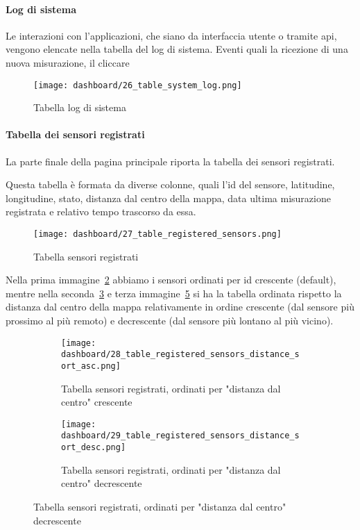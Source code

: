 \paragraph{Log di sistema}

Le interazioni con l'applicazioni, che siano da interfaccia utente o tramite \acrshort{api}, vengono elencate
nella tabella del log di sistema. Eventi quali la ricezione di una nuova misurazione, il cliccare

\begin{figure}[H]
  \centering
  \texttt{[image: dashboard/26\_table\_system\_log.png]}
  \caption{Tabella log di sistema}
  \label{fig:app-tab-system-log}
\end{figure}

\paragraph{Tabella dei sensori registrati}

La parte finale della pagina principale riporta la tabella dei sensori registrati.

Questa tabella è formata da diverse colonne, quali l'id del sensore, latitudine, longitudine, stato,
distanza dal centro della mappa, data ultima misurazione registrata e relativo tempo trascorso da essa.

\begin{figure}[H]
  \centering
  \texttt{[image: dashboard/27\_table\_registered\_sensors.png]}
  \caption{Tabella sensori registrati}
  \label{fig:app-tab-registered-sensors}
\end{figure}

Nella prima immagine~\ref{fig:app-tab-registered-sensors} abbiamo i sensori ordinati per id crescente (default),
mentre nella seconda~\ref{fig:app-tab-registered-sensors-distance-sort-asc} e
terza immagine~\ref{fig:app-tab-registered-sensors-distance-sort-desc} si ha la tabella ordinata rispetto
la distanza dal centro della mappa relativamente in ordine crescente (dal sensore più prossimo al più remoto) e
decrescente (dal sensore più lontano al più vicino).

\begin{figure}[H]
  \centering
  \begin{subfigure}{\textwidth}
    \centering
    \texttt{[image: dashboard/28\_table\_registered\_sensors\_distance\_sort\_asc.png]}
    \caption{Tabella sensori registrati, ordinati per "distanza dal centro" crescente}
    \label{fig:app-tab-registered-sensors-distance-sort-asc}
  \end{subfigure}

  \hfill
  \begin{subfigure}{\textwidth}
    \centering
    \texttt{[image: dashboard/29\_table\_registered\_sensors\_distance\_sort\_desc.png]}
    \caption{Tabella sensori registrati, ordinati per "distanza dal centro" decrescente}
    \label{fig:app-tab-registered-sensors-distance-sort-desc}
  \end{subfigure}
\end{figure}

